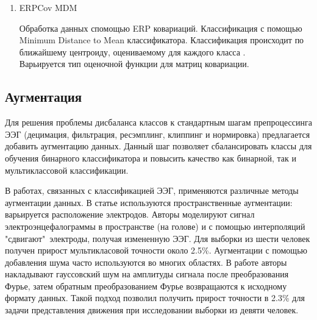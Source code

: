 \documentclass[12pt]{article}
\begin{document}
\begin{enumerate}
		
		\item ERPCov MDM
		
		Обработка данных спомощью ERP ковариаций. Классификация с помощью Minimum Distance to Mean классификатора.
		Классификация происходит по ближайшему центроиду, оцениваемому для каждого класса \cite{PyRiemann}. \\
		Варьируется тип оценочной функции для матриц ковариации.
		
	\end{enumerate}
	
	\subsection{Аугментация}
	Для решения проблемы дисбаланса классов к стандартным шагам препроцессинга ЭЭГ (децимация, фильтрация, ресэмплинг, клиппинг и нормировка) предлагается добавить аугментацию данных. Данный шаг позволяет сбалансировать классы для обучения бинарного классификатора и повысить качество как бинарной, так и мультиклассовой классификации.
	
	В работах, связанных с классификацией ЭЭГ, применяются различные методы аугментации данных. 
	В статье \cite{Krell2017} используются пространственные аугментации: варьируется расположение электродов. Авторы моделируют сигнал электроэнцефалограммы в пространстве (на голове) и с помощью интерполяций "сдвигают"\  электроды, получая измененную ЭЭГ. Для выборки из шести человек получен прирост мультикласовой точности около 2.5\%. Аугментации с помощью добавления шума часто используются во многих областях. В работе \cite{Zhang2018} авторы накладывают гауссовский шум на амплитуды сигнала после преобразования Фурье, затем обратным преобразованием Фурье возвращаются к исходному формату данных. Такой подход позволил получить прирост точности в 2.3\% для задачи представления движения при исследовании выборки из девяти человек. 
	
\end{document}
